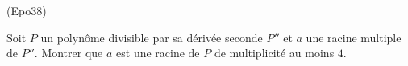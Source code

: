 \begin{tiny}(Epo38)\end{tiny} Soit $P$ un polynôme divisible par sa dérivée seconde $P''$ et $a$ une racine multiple de $P''$. Montrer que $a$ est une racine de $P$ de multiplicité au moins $4$. 